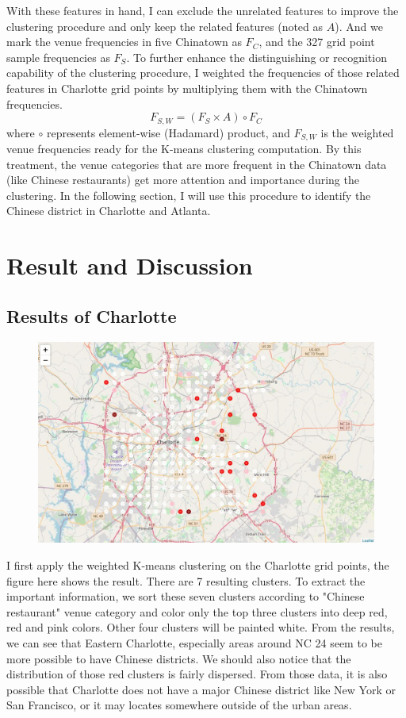 \documentclass{article}
\begin{document}
With these features in hand, I can exclude the unrelated features to improve the clustering procedure and only keep the related features (noted as $A$).
And we mark the venue frequencies in five Chinatown as $F_C$, and the 327 grid point sample frequencies as $F_S$.
To further enhance the distinguishing or recognition capability of the clustering procedure, I weighted the frequencies of those related features in Charlotte grid points by multiplying them with the Chinatown frequencies.
$$ F_{S, W} = (F_S \times A) \circ F_C $$
where $\circ$ represents element-wise (Hadamard) product, and $F_{S, W}$ is the weighted venue frequencies ready for the K-means clustering computation.
By this treatment, the venue categories that are more frequent in the Chinatown data (like Chinese restaurants) get more attention and importance during the clustering.
In the following section, I will use this procedure to identify the Chinese district in Charlotte and Atlanta.

\section{Result and Discussion}

\subsection{Results of Charlotte}

\begin{figure}[h!]
\includegraphics[width=1.0\textwidth]{cn4.jpg}
\centering
\end{figure}

I first apply the weighted K-means clustering on the Charlotte grid points, the figure here shows the result.
There are 7 resulting clusters.
To extract the important information, we sort these seven clusters according to "Chinese restaurant" venue category and color only the top three clusters into deep red, red and pink colors.
Other four clusters will be painted white.
From the results, we can see that Eastern Charlotte, especially areas around NC 24 seem to be more possible to have Chinese districts.
We should also notice that the distribution of those red clusters is fairly dispersed.
From those data, it is also possible that Charlotte does not have a major Chinese district like New York or San Francisco, or it may locates somewhere outside of the urban areas.
\end{document}

